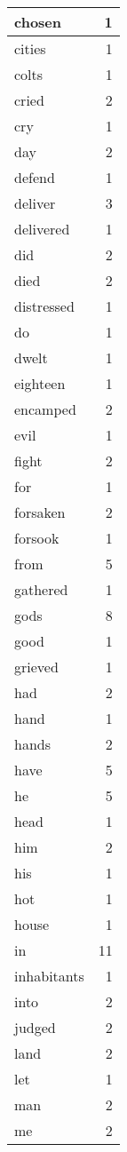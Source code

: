 \begin{center}
\begin{longtable}{l|r}
chosen & 1\\ \hline 
cities & 1\\ \hline 
colts & 1\\ \hline 
cried & 2\\ \hline 
cry & 1\\ \hline 
day & 2\\ \hline 
defend & 1\\ \hline 
deliver & 3\\ \hline 
delivered & 1\\ \hline 
did & 2\\ \hline 
died & 2\\ \hline 
distressed & 1\\ \hline 
do & 1\\ \hline 
dwelt & 1\\ \hline 
eighteen & 1\\ \hline 
encamped & 2\\ \hline 
evil & 1\\ \hline 
fight & 2\\ \hline 
for & 1\\ \hline 
forsaken & 2\\ \hline 
forsook & 1\\ \hline 
from & 5\\ \hline 
gathered & 1\\ \hline 
gods & 8\\ \hline 
good & 1\\ \hline 
grieved & 1\\ \hline 
had & 2\\ \hline 
hand & 1\\ \hline 
hands & 2\\ \hline 
have & 5\\ \hline 
he & 5\\ \hline 
head & 1\\ \hline 
him & 2\\ \hline 
his & 1\\ \hline 
hot & 1\\ \hline 
house & 1\\ \hline 
in & 11\\ \hline 
inhabitants & 1\\ \hline 
into & 2\\ \hline 
judged & 2\\ \hline 
land & 2\\ \hline 
let & 1\\ \hline 
man & 2\\ \hline 
me & 2\\ \hline 

\end{longtable}
\end{center}
